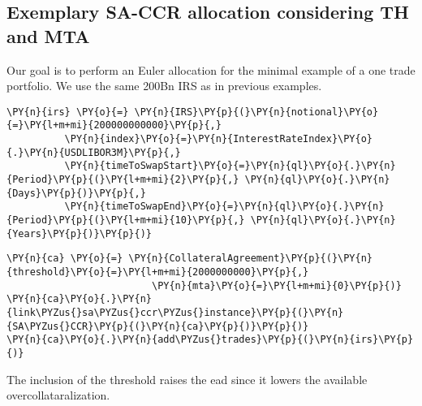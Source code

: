     

    
    \hypertarget{exemplary-sa-ccr-allocation-considering-th-and-mta}{%
\subsection{Exemplary SA-CCR allocation considering TH and
MTA}\label{exemplary-sa-ccr-allocation-considering-th-and-mta}}

Our goal is to perform an Euler allocation for the minimal example of a
one trade portfolio. We use the same 200Bn IRS as in previous examples.

    \begin{tcolorbox}[breakable, size=fbox, boxrule=1pt, pad at break*=1mm,colback=cellbackground, colframe=cellborder]
\begin{Verbatim}[commandchars=\\\{\}]
\PY{n}{irs} \PY{o}{=} \PY{n}{IRS}\PY{p}{(}\PY{n}{notional}\PY{o}{=}\PY{l+m+mi}{200000000000}\PY{p}{,}
          \PY{n}{index}\PY{o}{=}\PY{n}{InterestRateIndex}\PY{o}{.}\PY{n}{USDLIBOR3M}\PY{p}{,}
          \PY{n}{timeToSwapStart}\PY{o}{=}\PY{n}{ql}\PY{o}{.}\PY{n}{Period}\PY{p}{(}\PY{l+m+mi}{2}\PY{p}{,} \PY{n}{ql}\PY{o}{.}\PY{n}{Days}\PY{p}{)}\PY{p}{,}
          \PY{n}{timeToSwapEnd}\PY{o}{=}\PY{n}{ql}\PY{o}{.}\PY{n}{Period}\PY{p}{(}\PY{l+m+mi}{10}\PY{p}{,} \PY{n}{ql}\PY{o}{.}\PY{n}{Years}\PY{p}{)}\PY{p}{)}
\end{Verbatim}
\end{tcolorbox}

    \begin{tcolorbox}[breakable, size=fbox, boxrule=1pt, pad at break*=1mm,colback=cellbackground, colframe=cellborder]
\begin{Verbatim}[commandchars=\\\{\}]
\PY{n}{ca} \PY{o}{=} \PY{n}{CollateralAgreement}\PY{p}{(}\PY{n}{threshold}\PY{o}{=}\PY{l+m+mi}{2000000000}\PY{p}{,}
                         \PY{n}{mta}\PY{o}{=}\PY{l+m+mi}{0}\PY{p}{)}
\PY{n}{ca}\PY{o}{.}\PY{n}{link\PYZus{}sa\PYZus{}ccr\PYZus{}instance}\PY{p}{(}\PY{n}{SA\PYZus{}CCR}\PY{p}{(}\PY{n}{ca}\PY{p}{)}\PY{p}{)}
\PY{n}{ca}\PY{o}{.}\PY{n}{add\PYZus{}trades}\PY{p}{(}\PY{n}{irs}\PY{p}{)}
\end{Verbatim}
\end{tcolorbox}

    The inclusion of the threshold raises the ead since it lowers the
available overcollataralization.

